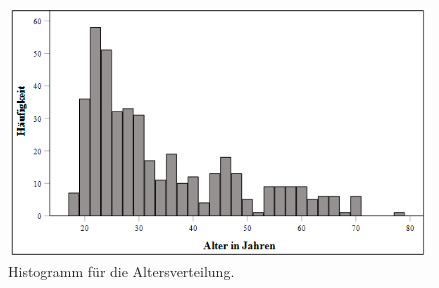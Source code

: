 \begin{figure}[htb]
    \centering
        \includegraphics[width=0.8\linewidth]{Histogramm - Altersverteilung.png}
        \caption[Histogramm Altersverteilung]{Histogramm für die Altersverteilung.}
        \label{Histogramm Altersverteilung}
\end{figure}

